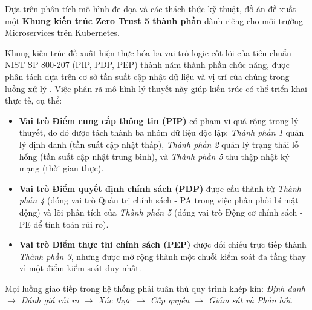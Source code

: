 Dựa trên phân tích mô hình đe dọa và các thách thức kỹ thuật, đồ án đề xuất một \textbf{Khung kiến trúc Zero Trust 5 thành phần} dành riêng cho môi trường Microservices trên Kubernetes. 

Khung kiến trúc đề xuất hiện thực hóa ba vai trò logic cốt lõi của tiêu chuẩn NIST SP 800-207 (PIP, PDP, PEP) thành năm thành phần chức năng, được phân tách dựa trên cơ sở tần suất cập nhật dữ liệu và vị trí của chúng trong luồng xử lý \parencite{nist800207}. Việc phân rã mô hình lý thuyết này giúp kiến trúc có thể triển khai thực tế, cụ thể:

\begin{itemize}[itemsep=6pt, parsep=0pt]
    \item \textbf{Vai trò Điểm cung cấp thông tin (PIP)} có phạm vi quá rộng trong lý thuyết, do đó được tách thành ba nhóm dữ liệu độc lập: \textit{Thành phần 1} quản lý định danh (tần suất cập nhật thấp), \textit{Thành phần 2} quản lý trạng thái lỗ hổng (tần suất cập nhật trung bình), và \textit{Thành phần 5} thu thập nhật ký mạng (thời gian thực).
    
    \item \textbf{Vai trò Điểm quyết định chính sách (PDP)} được cấu thành từ \textit{Thành phần 4} (đóng vai trò Quản trị chính sách - PA trong việc phân phối bí mật động) và lõi phân tích của \textit{Thành phần 5} (đóng vai trò Động cơ chính sách - PE để tính toán rủi ro).
    
    \item \textbf{Vai trò Điểm thực thi chính sách (PEP)} được đối chiếu trực tiếp thành \textit{Thành phần 3}, nhưng được mở rộng thành một chuỗi kiểm soát đa tầng thay vì một điểm kiểm soát duy nhất.
\end{itemize}

Mọi luồng giao tiếp trong hệ thống phải tuân thủ quy trình khép kín: \textit{Định danh $\rightarrow$ Đánh giá rủi ro $\rightarrow$ Xác thực $\rightarrow$ Cấp quyền $\rightarrow$ Giám sát và Phản hồi}.

